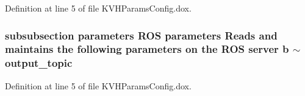 \-Definition at line 5 of file \-K\-V\-H\-Params\-Config.\-dox.

\subsubsection[{$\sim$output\-\_\-topic}]{\setlength{\rightskip}{0pt plus 5cm}subsubsection parameters \-R\-O\-S parameters \-Reads and maintains the following parameters on the \-R\-O\-S server b $\sim$output\-\_\-topic}\label{KVHParamsConfig_8dox_adbd4a4870f3a92a60ba5e19b5a08bec8}


\-Definition at line 5 of file \-K\-V\-H\-Params\-Config.\-dox.

